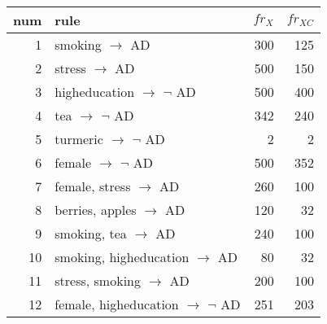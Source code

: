 \begin{tabular}{|r|l|r|r|}
\hline 
num&rule&$\mathit{fr_X}$&$\mathit{fr_{XC}}$\\
\hline
1&smoking $\rightarrow$ AD&300&125\\
2&stress $\rightarrow$ AD&500&150\\
3&higheducation $\rightarrow$ $\neg$ AD&500&400\\
4&tea $\rightarrow$ $\neg$ AD&342&240\\
5&turmeric $\rightarrow$ $\neg$ AD&2&2\\
6&female $\rightarrow$ $\neg$ AD&500&352\\
7&female, stress $\rightarrow$ AD&260&100\\
8&berries, apples $\rightarrow$ AD&120&32\\
9&smoking, tea $\rightarrow$ AD&240&100\\
10&smoking, higheducation $\rightarrow$ AD&80&32\\
11&stress, smoking $\rightarrow$ AD&200&100\\
12&female, higheducation $\rightarrow$ $\neg$ AD&251&203\\
\hline
\end{tabular}
